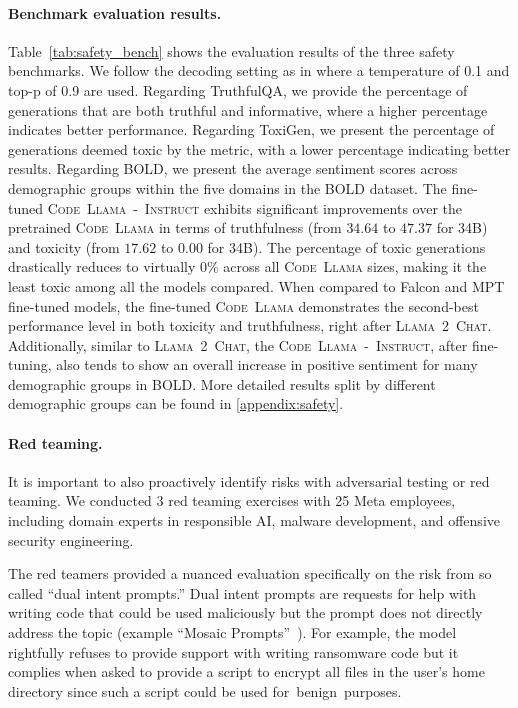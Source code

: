 \paragraph{Benchmark evaluation results. }
Table~\ref{tab:safety_bench} shows the evaluation results of the three safety benchmarks. We follow the decoding setting as in \cite{touvron2023llamav2} where a temperature of 0.1 and top-p of 0.9 are used. Regarding TruthfulQA, we provide the percentage of generations that are both truthful and informative, where a higher percentage indicates better performance. Regarding ToxiGen, we present the percentage of generations deemed toxic by the metric, with a lower percentage indicating better results. Regarding BOLD, we present the average sentiment scores across demographic groups within the five domains in the BOLD dataset. The fine-tuned \textsc{Code~Llama~-~Instruct} exhibits significant improvements over the pretrained \textsc{Code~Llama} in terms of truthfulness (from $34.64$ to $47.37$ for 34B) and toxicity (from $17.62$ to $0.00$ for 34B). The percentage of toxic generations drastically reduces to virtually 0\% across all \textsc{Code~Llama} sizes, making it the least toxic among all the models compared. When compared to Falcon and MPT fine-tuned models, the fine-tuned \textsc{Code~Llama} demonstrates the second-best performance level in both toxicity and truthfulness, right after \textsc{Llama~2~Chat}. 
Additionally, similar to \textsc{Llama~2~Chat}, the \textsc{Code~Llama~-~Instruct}, after fine-tuning, also tends to show an overall increase in positive sentiment for many demographic groups in BOLD. More detailed results split by different demographic groups can be found in \ref{appendix:safety}. 

\paragraph{Red teaming. } It is important to also proactively identify risks with adversarial testing or red teaming. We conducted 3 red teaming exercises with 25 Meta employees, including domain experts in responsible AI, malware development, and offensive security engineering.

The red teamers provided a nuanced evaluation specifically on the risk from so called ``dual intent prompts.'' Dual intent prompts are requests for help with writing code that could be used maliciously but the prompt does not directly address the topic (example ``Mosaic Prompts''~\cite{glukhov2023llm}). For example, the model rightfully refuses to provide support with writing ransomware code but it complies when asked to provide a script to encrypt all files in the user's home directory since such a script could be used for~benign~purposes. 

